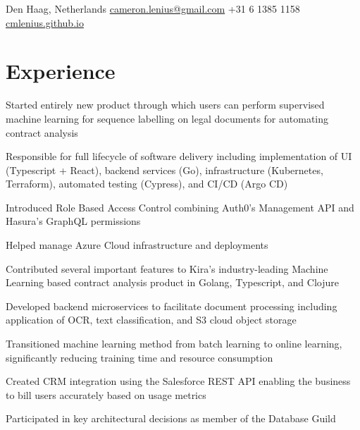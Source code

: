 \documentclass[]{resume}
\begin{document}

\separatorL
\contactline
  {Den Haag, Netherlands}
  {\href{mailto:cameron.lenius@gmail.com}{cameron.lenius@gmail.com}}
  {+31 6 1385 1158}
  {\href{cmlenius.github.io}{cmlenius.github.io}}
\separatorS

\begin{minipage}[t]{0.65\textwidth} 


\section{Experience}
\vspace{\topsep} %
\separatorS
\begin{tightemize}
\item Started entirely new product through which users can perform supervised machine learning for sequence labelling on legal documents for automating contract analysis
\item Responsible for full lifecycle of software delivery including implementation of UI (Typescript + React), backend services (Go), infrastructure (Kubernetes, Terraform), automated testing (Cypress), and CI/CD (Argo CD)
\item Introduced Role Based Access Control combining Auth0's Management API and Hasura's GraphQL permissions
\item Helped manage Azure Cloud infrastructure and deployments
\end{tightemize}
\separatorM

\separatorS
\begin{tightemize}
\item Contributed several important features to Kira's industry-leading Machine Learning based contract analysis product in Golang, Typescript, and Clojure
\item Developed backend microservices to facilitate document processing including application of OCR, text classification, and S3 cloud object storage
\item Transitioned machine learning method from batch learning to online learning, significantly reducing training time and resource consumption
\item Created CRM integration using the Salesforce REST API enabling the business to bill users accurately based on usage metrics
\item Participated in key architectural decisions as member of the Database Guild
\end{tightemize}
\separatorM


\end{minipage}
\end{document}
